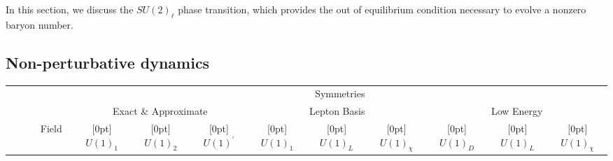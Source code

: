 \documentclass[prd,showpcs,amsmath,amssymb,nofootinbib,preprintnumbers,balancelastpage,longbibliography,superscriptaddress,notitlepage]{revtex4}
\begin{document}
In this section, we discuss the $SU(2)_\ell$ phase transition, which provides the out of equilibrium condition necessary to evolve a nonzero baryon number.

\subsection{Non-perturbative dynamics}

{\renewcommand{\arraystretch}{1.4}\begin{table*}[t!]
\begin{center}
    \begin{tabular}{| c || c | c | c || c | c | c || c | c | c |}
    \hline \multirow{2}{*}{} & 
    \multicolumn{9}{c|}{Symmetries}  \\ \cline{2-10} & \multicolumn{3}{c||}{Exact \& Approximate}& \multicolumn{3}{c||}{Lepton Basis}& \multicolumn{3}{c|}{Low Energy}\\
    \hline
       \ \ \ \ \ Field \ \ \ \ \  & \raisebox{0ex}[0pt]{$ \ \ U(1)_1 \ \ $} & \raisebox{0ex}[0pt]{$ \ \ U(1)_2 \ \ $} & \raisebox{0ex}[0pt]{$ \ \ U(1)^\prime \ \ $} & \raisebox{0ex}[0pt]{$ \ \ U(1)_1 \ \  $} & \raisebox{0ex}[0pt]{$ \ \ U(1)_L \ \  $} & \raisebox{0ex}[0pt]{$ \ \ U(1)_\chi \ \  $} & \raisebox{0ex}[0pt]{$ \ \ U(1)_D \ \  $} & \raisebox{0ex}[0pt]{$ \ \ U(1)_L \ \  $} & \raisebox{0ex}[0pt]{$ \ \ U(1)_\chi \ \  $}
        

\end{tabular}
\end{center}
\end{table*}}
\end{document}

